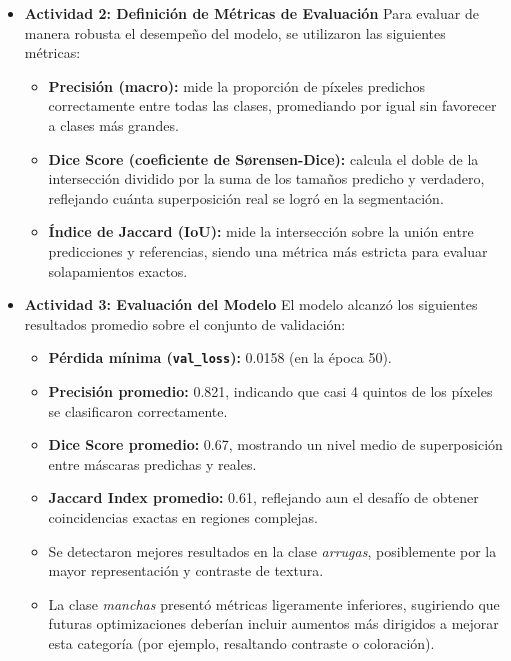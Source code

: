 \begin{enumerate}
\begin{itemize}
\vspace{0.5cm}

  \item\textbf{Actividad 2: Definición de Métricas de Evaluación}
  Para evaluar de manera robusta el desempeño del modelo, se utilizaron las siguientes métricas:
\begin{itemize}
  \item \textbf{Precisión (macro):} mide la proporción de píxeles predichos correctamente entre todas las clases, promediando por igual sin favorecer a clases más grandes.
  \item \textbf{Dice Score (coeficiente de Sørensen-Dice):} calcula el doble de la intersección dividido por la suma de los tamaños predicho y verdadero, reflejando cuánta superposición real se logró en la segmentación.
  \item \textbf{Índice de Jaccard (IoU):} mide la intersección sobre la unión entre predicciones y referencias, siendo una métrica más estricta para evaluar solapamientos exactos.
\end{itemize}

\vspace{0.5cm}

  \item\textbf{Actividad 3: Evaluación del Modelo}
  El modelo alcanzó los siguientes resultados promedio sobre el conjunto de validación:
\begin{itemize}
  \item \textbf{Pérdida mínima (\texttt{val\_loss}):} 0.0158 (en la época 50).
  \item \textbf{Precisión promedio:} 0.821, indicando que casi 4 quintos de los píxeles se clasificaron correctamente.
  \item \textbf{Dice Score promedio:} 0.67, mostrando un nivel medio de superposición entre máscaras predichas y reales.
  \item \textbf{Jaccard Index promedio:} 0.61, reflejando aun el desafío de obtener coincidencias exactas en regiones complejas.
  \item Se detectaron mejores resultados en la clase \emph{arrugas}, posiblemente por la mayor representación y contraste de textura.
  \item La clase \emph{manchas} presentó métricas ligeramente inferiores, sugiriendo que futuras optimizaciones deberían incluir aumentos más dirigidos a mejorar esta categoría (por ejemplo, resaltando contraste o coloración).
\end{itemize}


\end{itemize}
\end{enumerate}
